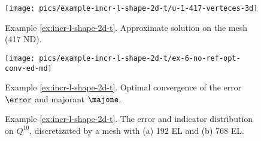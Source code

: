 \clearpage

\begin{figure}[!ht]
	\centering
	\texttt{[image: pics/example-incr-l-shape-2d-t/u-1-417-verteces-3d]}
	\caption{Example \ref{ex:incr-l-shape-2d-t}. 
	Approximate solution on the mesh (417 ND).}	
	\label{fig:example-incr-l-shape-approx}	
\end{figure}

\begin{figure}[!ht]
	\centering
	\texttt{[image: pics/example-incr-l-shape-2d-t/ex-6-no-ref-opt-conv-ed-md]}
	\caption{Example \ref{ex:incr-l-shape-2d-t}. 
	Optimal convergence of the error $\error$ and majorant $\majone$.}	
	\label{fig:example-incr-l-shape-uniform-convergence-ed-md}
\end{figure}

\begin{figure}[!ht]
	\centering
	\caption{Example \ref{ex:incr-l-shape-2d-t}. 
	The error and indicator distribution on $Q^{10}$, discretizated by a  
	mesh with (a) 192 EL and (b) 768 EL.}
	\label{fig:example-incr-l-shape-2d-e-maj-distr}
\end{figure}

